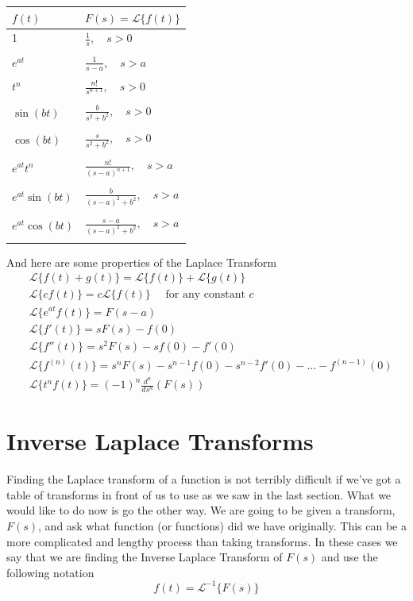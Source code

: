 \documentclass[10pt,reqno]{book}
\theoremstyle{definition}
\def\L{\mathscr{L}}
\begin{document}
	\begin{center}
	\begin{tabular}{ll}
		$ f(t) $ & $ F(s) = \L\{f(t)\} $ \\ \midrule
		1 & $ \displaystyle{\frac{1}{s}}, \quad s > 0 $\\ \\
		$ e^{at} $ & $ \displaystyle{\frac{1}{s-a}}, \quad s > a $ \\ \\
		$ t^n $ & $ \displaystyle{\frac{n!}{s^{n+1}}}, \quad s> 0 $ \\ \\
		$ \sin(bt) $ & $ \displaystyle{\frac{b}{s^2 + b^2}}, \quad s > 0 $ \\ \\
		$ \cos(bt) $ & $ \displaystyle{\frac{s}{s^2 + b^2}}, \quad s > 0 $ \\ \\
		$ e^{at} t^n $ & $ \displaystyle{\frac{n!}{(s-a)^{n+1}}}, \quad s > a $ \\ \\
		$ e^{at}\sin(bt) $ & $ \displaystyle{\frac{b}{(s-a)^2 + b^2}}, \quad s > a $ \\ \\
		$ e^{at}\cos(bt) $ & $ \displaystyle{\frac{s-a}{(s-a)^2 + b^2}}, \quad s > a $ \\ \\
	\end{tabular}
	\end{center}
	And here are some properties of the Laplace Transform
	\begin{align*}
		& \L\{f(t) + g(t)\} = \L\{f(t)\} + \L\{g(t)\}\\
		& \L\{cf(t)\} = c\L\{f(t)\} \quad \text{ for any constant } c\\
		& \L\{e^{at} f(t)\} = F(s-a)\\
		& \L\{f'(t)\} = sF(s) - f(0)\\
		& \L\{f''(t)\} = s^2F(s) - sf(0) - f'(0)\\
		& \L\{f^{(n)}(t)\} = s^n F(s) - s^{n-1}f(0) - s^{n-2}f'(0) - \ldots - f^{(n-1)}(0)\\
		& \L\{t^nf(t)\} = (-1)^n \frac{d^n}{ds^n} (F(s))
	\end{align*}
	 
	\section{Inverse Laplace Transforms}
	Finding the Laplace transform of a function is not terribly difficult if we've got a table of transforms in front of us to use as we saw in the last section. What we would like to do now is go the other way. We are going to be given a transform, $ F(s) $, and ask what function (or functions) did we have originally. This can be a more complicated and lengthy process than taking transforms. In these cases we say that we are finding the Inverse Laplace Transform of $ F(s) $ and use the following notation
	\[ f(t) = \L^{-1}\{F(s)\} \]
	
\end{document}
